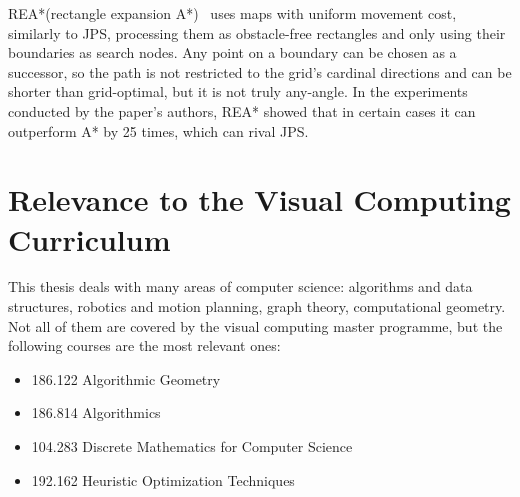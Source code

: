 \documentclass{article}
\begin{document}
REA*(rectangle expansion A*)~\cite{zhang2016rectangle} uses maps with uniform movement cost, similarly to JPS, processing them as obstacle-free rectangles and only using their boundaries as search nodes. Any point on a boundary can be chosen as a successor, so the path is not restricted to the grid's cardinal directions and can be shorter than grid-optimal, but it is not truly any-angle. In the experiments conducted by the paper's authors, REA* showed that in certain cases it can outperform A* by 25 times, which can rival JPS.




\section{Relevance to the Visual Computing Curriculum}
This thesis deals with many areas of computer science: algorithms and data structures, robotics and motion planning, graph theory, computational geometry. Not all of them are covered by the visual computing master programme, but the following courses are the most relevant ones:

\begin{itemize}	
	\item 186.122 Algorithmic Geometry
	\item 186.814 Algorithmics
	\item 104.283 Discrete Mathematics for Computer Science
	\item 192.162 Heuristic Optimization Techniques
\end{itemize}



\end{document}
